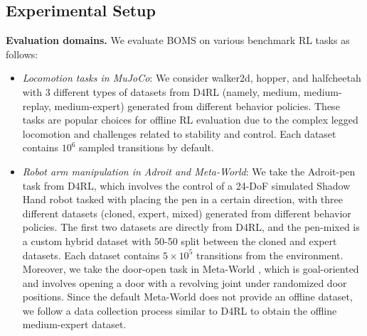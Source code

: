 \subsection{Experimental Setup}
\vspace{-1mm}
\textbf{Evaluation domains.} We evaluate BOMS on various benchmark RL tasks as follows:
\begin{itemize}[leftmargin=*]
    \item \textit{Locomotion tasks in MuJoCo}: We consider walker2d, hopper, and halfcheetah with 3 different types of datasets from D4RL \citep{fu2020d4rl} (namely, medium, medium-replay, medium-expert) generated from different behavior policies. These tasks are popular choices for offline RL evaluation due to the complex legged locomotion and challenges related to stability and control. Each dataset contains $10^6$ sampled transitions by default.
    \item \textit{Robot arm manipulation in Adroit and Meta-World}: We take the Adroit-pen task from D4RL, which involves the control of a 24-DoF simulated Shadow Hand robot tasked with placing the pen in a certain direction, with three different datasets (cloned, expert, mixed) generated from different behavior policies. The first two datasets are directly from D4RL, and the pen-mixed is a custom hybrid dataset with 50-50 split between the cloned and expert datasets. Each dataset contains $5\times 10^5$ transitions from the environment. Moreover, we take the door-open task in Meta-World \citep{yu2019meta}, which is goal-oriented and involves opening a door with a revolving joint under randomized door positions. Since the default Meta-World does not provide an offline dataset, we follow a data collection process similar to D4RL to obtain the offline medium-expert dataset.
\end{itemize}
\vspace{-3mm}

